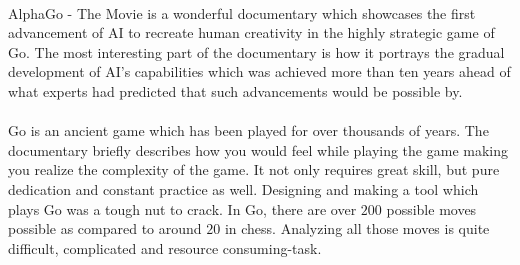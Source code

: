 \documentclass[44pt]{article}
\begin{document}


















\paragraph{}
	AlphaGo - The Movie is a wonderful documentary which showcases the first advancement of AI to recreate human creativity in the highly strategic game of Go.
	The most interesting part of the documentary is how it portrays the gradual development of AI’s capabilities which was achieved more than ten years ahead of what experts had predicted that such advancements would be possible by.


\paragraph{}
	Go is an ancient game which has been played for over thousands of years.
	The documentary briefly describes how you would feel while playing the game making you realize the complexity of the game. 
	It not only requires great skill, but pure dedication and constant practice as well.
	Designing and making a tool which plays Go was a tough nut to crack.
	In Go, there are over $200$ possible moves possible as compared to around $20$ in chess.
	Analyzing all those moves is quite difficult, complicated and resource consuming-task.
   
\end{document}
